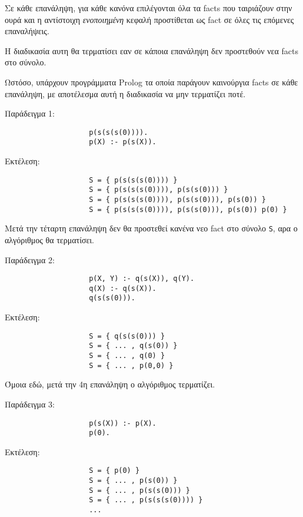 \documentclass[10pt]{article}
\begin{document}
Σε κάθε επανάληψη, για κάθε κανόνα επιλέγονται όλα τα facts που ταιριάζουν στην ουρά και η αντίστοιχη \textit{ενοποιημένη} κεφαλή προστίθεται ως fact σε όλες τις επόμενες επαναλήψεις.\

Η διαδικασία αυτη θα τερματίσει εαν σε κάποια επανάληψη δεν προστεθούν νεα facts στο σύνολο.\

Ωστόσο, υπάρχουν προγράμματα Prolog τα οποία παράγουν καινούργια facts σε κάθε επανάληψη, με αποτέλεσμα αυτή η διαδικασία να μην τερματίζει ποτέ.\


Παράδειγμα 1:
\begin{verbatim}
                    p(s(s(s(0)))).
                    p(Χ) :- p(s(Χ)).
\end{verbatim}

Εκτέλεση:
\begin{verbatim}
                    S = { p(s(s(s(0)))) }
                    S = { p(s(s(s(0)))), p(s(s(0))) }
                    S = { p(s(s(s(0)))), p(s(s(0))), p(s(0)) }
                    S = { p(s(s(s(0)))), p(s(s(0))), p(s(0)) p(0) }
\end{verbatim}

Μετά την τέταρτη επανάληψη δεν θα προστεθεί κανένα νεο fact στο σύνολο \verb|S|, αρα ο αλγόριθμος θα τερματίσει.





Παράδειγμα 2:
\begin{verbatim}
                    p(X, Y) :- q(s(X)), q(Y).
                    q(X) :- q(s(X)).
                    q(s(s(0))).
\end{verbatim}

Εκτέλεση:
\begin{verbatim}
                    S = { q(s(s(0))) }
                    S = { ... , q(s(0)) }
                    S = { ... , q(0) }
                    S = { ... , p(0,0) }
\end{verbatim}

Όμοια εδώ, μετά την 4η επανάληψη ο αλγόριθμος τερματίζει.




Παράδειγμα 3:
\begin{verbatim}
                    p(s(X)) :- p(X).
                    p(0).
\end{verbatim}

Εκτέλεση:
\begin{verbatim}
                    S = { p(0) }
                    S = { ... , p(s(0)) }
                    S = { ... , p(s(s(0))) }
                    S = { ... , p(s(s(s(0)))) }
                    ...
\end{verbatim}
\end{document}
